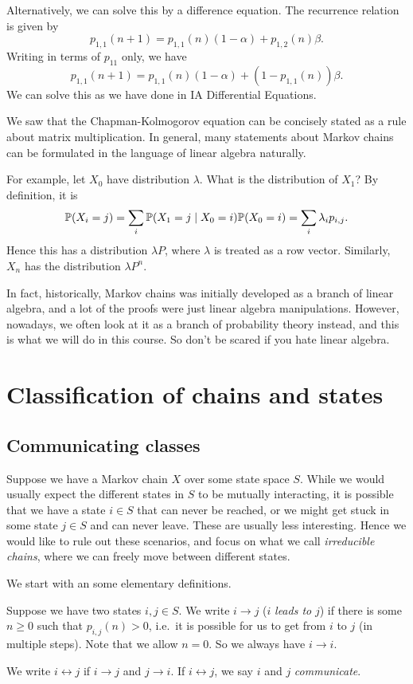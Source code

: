 \documentclass[a4paper]{article}
\begin{document}
\begin{eg}
  Alternatively, we can solve this by a difference equation. The recurrence relation is given by
  \[
    p_{1, 1}(n + 1) = p_{1, 1}(n)(1 - \alpha) + p_{1, 2}(n)\beta.
  \]
  Writing in terms of $p_{11}$ only, we have
  \[
    p_{1, 1}(n + 1) = p_{1, 1}(n)(1 - \alpha) + (1 - p_{1, 1}(n))\beta.
  \]
  We can solve this as we have done in IA Differential Equations.
\end{eg}
We saw that the Chapman-Kolmogorov equation can be concisely stated as a rule about matrix multiplication. In general, many statements about Markov chains can be formulated in the language of linear algebra naturally.

For example, let $X_0$ have distribution $\lambda$. What is the distribution of $X_1$? By definition, it is
\[
  \P(X_i = j) = \sum_i \P(X_1 = j\mid X_0 = i)\P(X_0 = i) = \sum_i \lambda_i p_{i, j}.
\]
Hence this has a distribution $\lambda P$, where $\lambda$ is treated as a row vector. Similarly, $X_n$ has the distribution $\lambda P^n$.

In fact, historically, Markov chains was initially developed as a branch of linear algebra, and a lot of the proofs were just linear algebra manipulations. However, nowadays, we often look at it as a branch of probability theory instead, and this is what we will do in this course. So don't be scared if you hate linear algebra.

\section{Classification of chains and states}
\subsection{Communicating classes}
Suppose we have a Markov chain $X$ over some state space $S$. While we would usually expect the different states in $S$ to be mutually interacting, it is possible that we have a state $i \in S$ that can never be reached, or we might get stuck in some state $j \in S$ and can never leave. These are usually less interesting. Hence we would like to rule out these scenarios, and focus on what we call \emph{irreducible chains}, where we can freely move between different states.

We start with an some elementary definitions.
\begin{defi}
  Suppose we have two states $i, j\in S$. We write $i \to j$ ($i$ \emph{leads to} $j$) if there is some $n \geq 0$ such that $p_{i, j}(n) > 0$, i.e.\ it is possible for us to get from $i$ to $j$ (in multiple steps). Note that we allow $n = 0$. So we always have $i \to i$.

  We write $i \leftrightarrow j$ if $i \to j$ and $j \to i$. If $i \leftrightarrow j$, we say $i$ and $j$ \emph{communicate}.
\end{defi}
\end{document}
